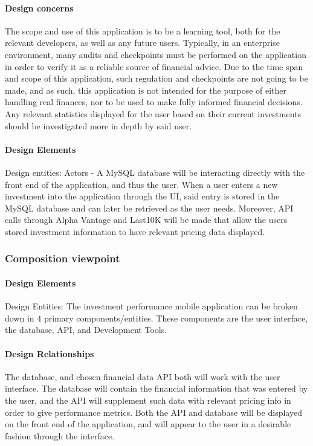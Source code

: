 \documentclass[onecolumn, draftclsnofoot,10pt, compsoc]{IEEEtran}
\begin{document}
\paragraph{Design concerns}
        The scope and use of this application is to be a learning tool, both for the relevant developers, as well as any future users. Typically, in an enterprise environment, many audits and
        checkpoints must be performed on the application in order to verify it as a reliable source of financial advice. Due to the time span and scope of this application, such regulation and
        checkpoints are not going to be made, and as such, this application is not intended for the purpose of either handling real finances, nor to be used to make fully informed financial decisions.
        Any relevant statistics displayed for the user based on their current investments should be investigated more in depth by said user.

\paragraph{Design Elements}
        Design entities: Actors - A MySQL database will be interacting directly with the front end of the application, and thus the user. When a user enters a new investment into the application
        through the UI, said entry is stored in the MySQL database and can later be retrieved as the user needs. Moreover, API calls through Alpha Vantage and Last10K will be made that allow the users stored investment
        information to have relevant pricing data displayed.

\subsubsection{Composition viewpoint}
\paragraph{Design Elements}
        Design Entities: The investment performance mobile application can be broken down in 4 primary components/entities. These components are the user interface, the database, API, and Development Tools.

\paragraph{Design Relationships}
        The database, and chosen financial data API both will work with the user interface. The database will contain the financial information that was entered by the user, and the API will
        supplement such data with relevant pricing info in order to give performance metrics. Both the API and database will be displayed on the front end of the application, and will appear
        to the user in a desirable fashion through the interface.
\end{document}
